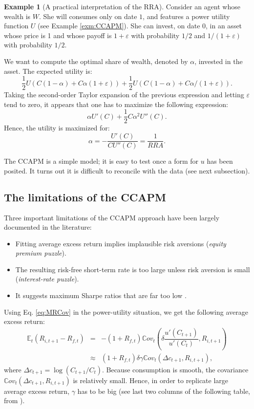 \documentclass[
  12pt,
]{book}
\providecommand{\tightlist}{%
  \setlength{\itemsep}{0pt}\setlength{\parskip}{0pt}}
\theoremstyle{definition}
\theoremstyle{definition}
\newtheorem{example}{Example}[chapter]
\theoremstyle{definition}
\theoremstyle{definition}
\theoremstyle{remark}
\begin{document}
\begin{example}[A practical interpretation of the RRA]
\protect\hypertarget{exm:CCAPMRRAinvestment}{}\label{exm:CCAPMRRAinvestment}Consider an agent whose wealth is \(W\). She will consumes only on date \(1\), and features a power utility function \(U\) (see Example \ref{exm:CCAPM}). She can invest, on date \(0\), in an asset whose price is 1 and whose payoff is \(1+\varepsilon\) with probability \(1/2\) and \(1/(1+\varepsilon)\) with probability \(1/2\).

We want to compute the optimal share of wealth, denoted by \(\alpha\), invested in the asset. The expected utility is:
\[
\frac{1}{2}U\left(C(1-\alpha)+C\alpha(1+\varepsilon)\right) + \frac{1}{2}U\left(C(1-\alpha)+C\alpha/(1+\varepsilon)\right).
\]
Taking the second-order Taylor expansion of the previous expression and letting \(\varepsilon\) tend to zero, it appears that one has to maximize the following expression:
\[
\alpha U'(C) + \frac{1}{2}C \alpha^2 U''(C).
\]
Hence, the utility is maximized for:
\[
\alpha = - \frac{U'(C)}{C U''(C)} = \frac{1}{RRA}.
\]
\end{example}

The CCAPM is a simple model; it is easy to test once a form for \(u\) has been posited. It turns out it is difficult to reconcile with the data (see next subsection).

\hypertarget{the-limitations-of-the-ccapm}{%
\subsection{The limitations of the CCAPM}\label{the-limitations-of-the-ccapm}}

Three important limitations of the CCAPM approach have been largely documented in the literature:

\begin{itemize}
\tightlist
\item
  Fitting average excess return implies implausible risk aversions (\emph{equity premium puzzle}).
\item
  The resulting risk-free short-term rate is too large unless risk aversion is small (\emph{interest-rate puzzle}).
\item
  It suggests maximum Sharpe ratios that are far too low \citep{Hansen_Jagannathan_1991}.
\end{itemize}

Using Eq. \eqref{eq:MRCov} in the power-utility situation, we get the following average excess return:
\begin{eqnarray*}
\mathbb{E}_t(R_{i,t+1} - R_{f,t}) &=& - (1 + R_{f,t}) \mathbb{C}ov_t\left(\delta \dfrac{u'(C_{t+1})}{u'(C_{t})},R_{i,t+1}\right)\\
&\approx& (1 + R_{f,t}) \delta \gamma  \mathbb{C}ov_t\left(\Delta c_{t+1},R_{i,t+1}\right),
\end{eqnarray*}
where \(\Delta c_{t+1} = \log(C_{t+1}/C_t)\).
Because consumption is smooth, the covariance \(\mathbb{C}ov_t\left(\Delta c_{t+1},R_{i,t+1}\right)\) is relatively small.
Hence, in order to replicate large average excess return, \(\gamma\) has to be big (see last two columns of the following table, from \citet{Campbell_1999}).
\end{document}
